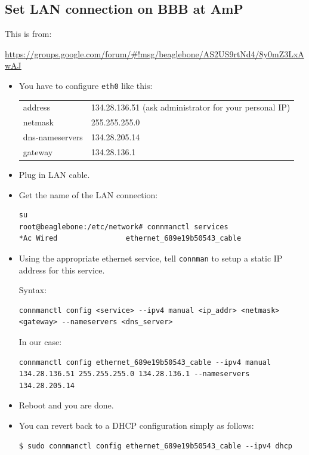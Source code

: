 \documentclass[
	fontsize=10pt
	paper=a4
]{scrartcl}
\begin{document}
\subsection{Set LAN connection on BBB at AmP}

This is from:

\url{https://groups.google.com/forum/#!msg/beaglebone/AS2US9rtNd4/8y0mZ3LxAwAJ}

\begin{itemize}
\item You have to configure \texttt{eth0} like this:

\begin{tabular}{l l}
address & 134.28.136.51 (ask administrator for your personal IP)\\
netmask & 255.255.255.0 \\
dns-nameservers & 134.28.205.14 \\
gateway & 134.28.136.1
\end{tabular}

\item Plug in LAN cable.

\item Get the name of the LAN connection:
\begin{lstlisting}
su
root@beaglebone:/etc/network# connmanctl services
*Ac Wired                ethernet_689e19b50543_cable
\end{lstlisting}


\item Using the appropriate ethernet service, tell \texttt{connman} to setup a static IP address for this service.

Syntax: 
\begin{lstlisting}[breaklines=true]
connmanctl config <service> --ipv4 manual <ip_addr> <netmask> <gateway> --nameservers <dns_server>
\end{lstlisting}

In our case:
\begin{lstlisting}[breaklines=true]
connmanctl config ethernet_689e19b50543_cable --ipv4 manual 134.28.136.51 255.255.255.0 134.28.136.1 --nameservers 134.28.205.14
\end{lstlisting}


\item Reboot and you are done.


\item You can revert back to a DHCP configuration simply as follows:
\begin{lstlisting}
$ sudo connmanctl config ethernet_689e19b50543_cable --ipv4 dhcp
\end{lstlisting}

\end{itemize}
\end{document}
